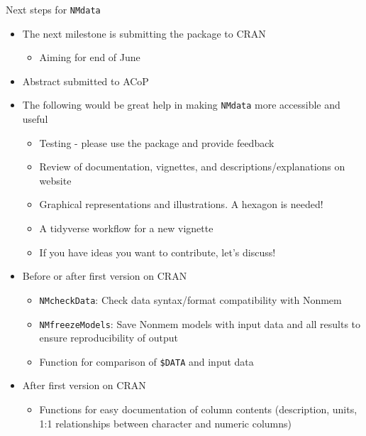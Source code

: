 \documentclass[
  8pt,
  ignorenonframetext,
  aspectratio=169]{beamer}
\providecommand{\tightlist}{%
  \setlength{\itemsep}{0pt}\setlength{\parskip}{0pt}}
\begin{document}
\begin{frame}[fragile]{Next steps for \texttt{NMdata}}
\protect\hypertarget{next-steps-for-nmdata-1}{}
\begin{itemize}
\tightlist
\item
  The next milestone is submitting the package to CRAN

  \begin{itemize}
  \tightlist
  \item
    Aiming for end of June
  \end{itemize}
\item
  Abstract submitted to ACoP
\item
  The following would be great help in making \texttt{NMdata} more
  accessible and useful

  \begin{itemize}
  \tightlist
  \item
    Testing - please use the package and provide feedback
  \item
    Review of documentation, vignettes, and descriptions/explanations on
    website
  \item
    Graphical representations and illustrations. A hexagon is needed!
  \item
    A tidyverse workflow for a new vignette
  \item
    If you have ideas you want to contribute, let's discuss!
  \end{itemize}
\item
  Before or after first version on CRAN

  \begin{itemize}
  \tightlist
  \item
    \texttt{NMcheckData}: Check data syntax/format compatibility with
    Nonmem
  \item
    \texttt{NMfreezeModels}: Save Nonmem models with input data and all
    results to ensure reproducibility of output
  \item
    Function for comparison of \texttt{\$DATA} and input data
  \end{itemize}
\item
  After first version on CRAN

  \begin{itemize}
  \tightlist
  \item
    Functions for easy documentation of column contents (description,
    units, 1:1 relationships between character and numeric columns)
  \end{itemize}
\end{itemize}
\end{frame}
\end{document}
